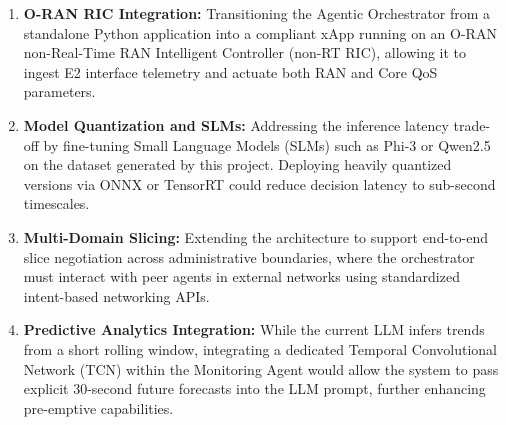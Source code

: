 \begin{enumerate}
  \item \textbf{O-RAN RIC Integration:} Transitioning the Agentic Orchestrator from a standalone Python application into a compliant xApp running on an O-RAN non-Real-Time RAN Intelligent Controller (non-RT RIC), allowing it to ingest E2 interface telemetry and actuate both RAN and Core QoS parameters.
  
  \item \textbf{Model Quantization and SLMs:} Addressing the inference latency trade-off by fine-tuning Small Language Models (SLMs) such as Phi-3 or Qwen2.5 on the dataset generated by this project. Deploying heavily quantized versions via ONNX or TensorRT could reduce decision latency to sub-second timescales.
  
  \item \textbf{Multi-Domain Slicing:} Extending the architecture to support end-to-end slice negotiation across administrative boundaries, where the orchestrator must interact with peer agents in external networks using standardized intent-based networking APIs.
  
  \item \textbf{Predictive Analytics Integration:} While the current LLM infers trends from a short rolling window, integrating a dedicated Temporal Convolutional Network (TCN) within the Monitoring Agent would allow the system to pass explicit 30-second future forecasts into the LLM prompt, further enhancing pre-emptive capabilities.
\end{enumerate}

